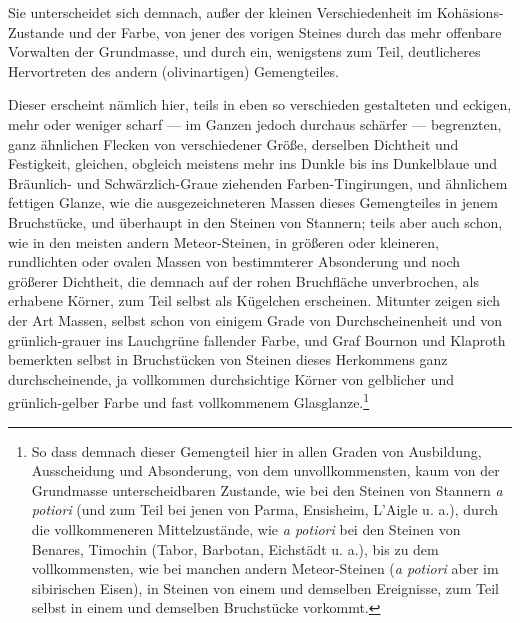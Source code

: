 \documentclass[a4paper, 11pt, oneside, german]{article}
\begin{document}
Sie unterscheidet sich demnach, außer der kleinen Verschiedenheit im Kohäsions-Zustande und der Farbe, von jener des vorigen Steines durch das mehr offenbare Vorwalten der Grundmasse, und durch ein, wenigstens zum Teil, deutlicheres Hervortreten des andern (olivinartigen) Gemengteiles.

Dieser erscheint nämlich hier, teils in eben so verschieden gestalteten und eckigen, mehr oder weniger scharf --- im Ganzen jedoch durchaus schärfer --- begrenzten, ganz ähnlichen Flecken von verschiedener Größe, derselben Dichtheit und Festigkeit, gleichen, obgleich meistens mehr ins Dunkle bis ins Dunkelblaue und Bräunlich- und Schwärzlich-Graue ziehenden Farben-Tingirungen, und ähnlichem fettigen Glanze, wie die ausgezeichneteren Massen dieses Gemengteiles in jenem Bruchstücke, und überhaupt in den Steinen von Stannern; teils aber auch schon, wie in den meisten andern Meteor-Steinen, in größeren oder kleineren, rundlichten oder ovalen Massen von bestimmterer Absonderung und noch größerer Dichtheit, die demnach auf der rohen Bruchfläche unverbrochen, als erhabene Körner, zum Teil selbst als Kügelchen erscheinen. Mitunter zeigen sich der Art Massen, selbst schon von einigem Grade von Durchscheinenheit und von grünlich-grauer ins Lauchgrüne fallender Farbe, und Graf Bournon und Klaproth bemerkten selbst in Bruchstücken von Steinen dieses Herkommens ganz durchscheinende, ja vollkommen durchsichtige Körner von gelblicher und grünlich-gelber Farbe und fast vollkommenem Glasglanze.\footnote{So dass demnach dieser Gemengteil hier in allen Graden von Ausbildung, Ausscheidung und Absonderung, von dem unvollkommensten, kaum von der Grundmasse unterscheidbaren Zustande, wie bei den Steinen von Stannern \emph{a potiori} (und zum Teil bei jenen von Parma, Ensisheim, L'Aigle u. a.), durch die vollkommeneren Mittelzustände, wie \emph{a potiori} bei den Steinen von Benares, Timochin (Tabor, Barbotan, Eichstädt u. a.), bis zu dem vollkommensten, wie bei manchen andern Meteor-Steinen (\emph{a potiori} aber im sibirischen Eisen), in Steinen von einem und demselben Ereignisse, zum Teil selbst in einem und demselben Bruchstücke vorkommt.}
\end{document}

